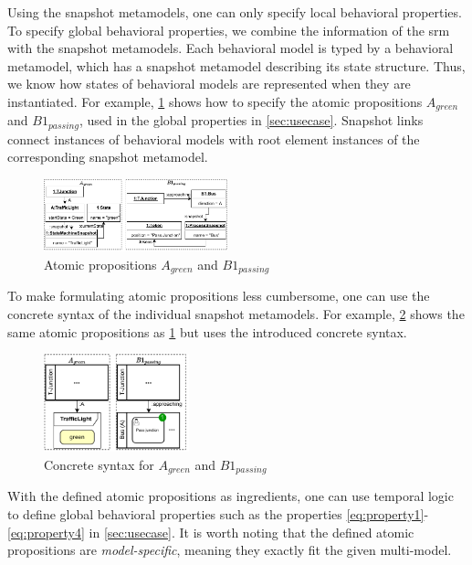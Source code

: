 \documentclass{jot}
\begin{document}

Using the snapshot metamodels, one can only specify local behavioral properties.
To specify global behavioral properties, we combine the information of the \gls*{srm} with the snapshot metamodels.
Each behavioral model is typed by a behavioral metamodel, which has a snapshot metamodel describing its state structure.
Thus, we know how states of behavioral models are represented when they are instantiated.
For example, \cref{fig:atomic_propositions} shows how to specify the atomic propositions $A_{green}$ and $B1_{passing}$, used in the global properties in \autoref{sec:usecase}.
Snapshot links connect instances of behavioral models with root element instances of the corresponding snapshot metamodel. 

\begin{figure}[h]
    \centering
    \includegraphics[width=0.475\textwidth]{figures/atomic_props.pdf}
    \caption{Atomic propositions $A_{green}$ and $B1_{passing}$}
    \label{fig:atomic_propositions}
\end{figure}

To make formulating atomic propositions less cumbersome, one can use the concrete syntax of the individual snapshot metamodels.
For example, \cref{fig:atomic_propositions_concrete} shows the same atomic propositions as \cref{fig:atomic_propositions} but uses the introduced concrete syntax.

\begin{figure}[h]
    \centering
    \includegraphics[width=0.375\textwidth]{figures/atomic_props_concrete.pdf}
    \caption{Concrete syntax for $A_{green}$ and $B1_{passing}$}
    \label{fig:atomic_propositions_concrete}
\end{figure}

With the defined atomic propositions as ingredients, one can use temporal logic to define global behavioral properties such as the properties \eqref{eq:property1}-\eqref{eq:property4} in \autoref{sec:usecase}.
It is worth noting that the defined atomic propositions are \emph{model-specific}, meaning they exactly fit the given multi-model.
\end{document}

